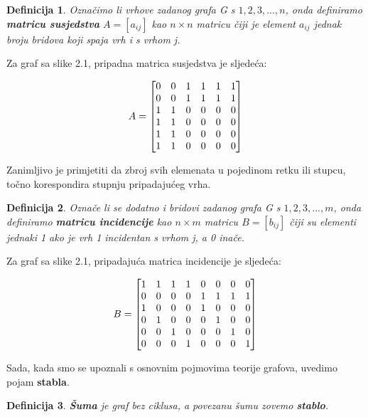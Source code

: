 \documentclass[times, utf8, zavrsni]{fer}
\newtheorem{definition}{Definicija}[section]
\begin{document}
\begin{definition}
	Označimo li vrhove zadanog grafa G s ${1, 2, 3,..., n}$, onda definiramo \textbf{matricu susjedstva} $A = [a_{ij}]$ kao $n \times n$ matricu čiji je element $a_{ij}$ jednak broju bridova koji spaja vrh i s vrhom j.
\end{definition}

Za graf sa slike 2.1, pripadna matrica susjedstva je sljedeća:

\[
\centering
A = 
\begin{bmatrix}
	0 & 0 & 1 & 1 & 1 & 1 \\
	0 & 0 & 1 & 1 & 1 & 1\\
	1 & 1 & 0 & 0 & 0 & 0 \\
	1 & 1 & 0 & 0 & 0 & 0 \\
	1 & 1 & 0 & 0 & 0 & 0 \\
	1 & 1 & 0 & 0 & 0 & 0
\end{bmatrix}
\]

Zanimljivo je primjetiti da zbroj svih elemenata u pojedinom retku ili stupcu, točno korespondira stupnju pripadajućeg vrha.

\begin{definition}
	Označe li se dodatno i bridovi zadanog grafa G s ${1, 2, 3, ..., m}$, onda definiramo \textbf{matricu incidencije} kao $n \times m$ matricu $B = [b_{ij}]$ čiji su elementi jednaki 1 ako je vrh 1 incidentan s vrhom j, a 0 inače.
\end{definition}

Za graf sa slike 2.1, pripadajuća matrica incidencije je sljedeća:

\[
\centering
B = 
\begin{bmatrix}
	1 & 1 & 1 & 1 & 0 & 0 & 0 & 0 \\
	0 & 0 & 0 & 0 & 1 & 1 & 1 & 1 \\
	1 & 0 & 0 & 0 & 1 & 0 & 0 & 0 \\
	0 & 1 & 0 & 0 & 0 & 1 & 0 & 0 \\
	0 & 0 & 1 & 0 & 0 & 0 & 1 & 0 \\
	0 & 0 & 0 & 1 & 0 & 0 & 0 & 1
\end{bmatrix}
\]

Sada, kada smo se upoznali s osnovnim pojmovima teorije grafova, uvedimo pojam \textbf{stabla}.

\begin{definition}
	\textbf{Šuma} je graf bez ciklusa, a povezanu šumu zovemo \textbf{stablo}.
\end{definition}
\end{document}
